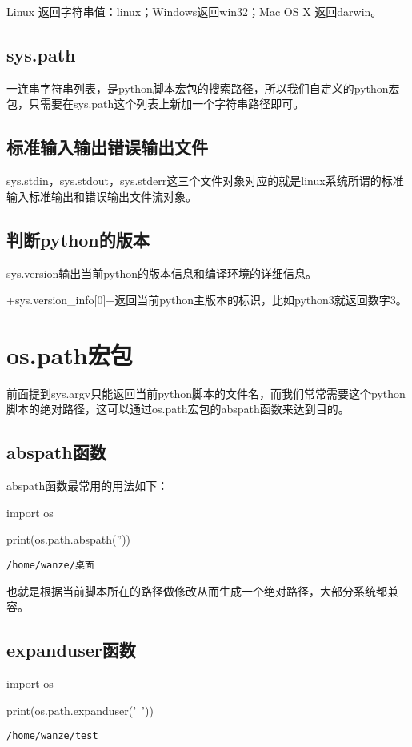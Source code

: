 \documentclass[12pt,oneside]{book}
\begin{document}
\begin{common-format}
Linux 返回字符串值：linux；Windows返回win32；Mac OS X 返回darwin。

\section{sys.path}
一连串字符串列表，是python脚本宏包的搜索路径，所以我们自定义的python宏包，只需要在sys.path这个列表上新加一个字符串路径即可。

\section{标准输入输出错误输出文件}
sys.stdin，sys.stdout，sys.stderr这三个文件对象对应的就是linux系统所谓的标准输入标准输出和错误输出文件流对象。

\section{判断python的版本}
sys.version输出当前python的版本信息和编译环境的详细信息。

+sys.version_info[0]+返回当前python主版本的标识，比如python3就返回数字3。



\chapter{os.path宏包}
前面提到sys.argv只能返回当前python脚本的文件名，而我们常常需要这个python脚本的绝对路径，这可以通过os.path宏包的abspath函数来达到目的。

\section{abspath函数}
abspath函数最常用的用法如下：
\begin{tcbpython}
import os

print(os.path.abspath(''))
\end{tcbpython}
\begin{Verbatim}
/home/wanze/桌面
\end{Verbatim}


也就是根据当前脚本所在的路径做修改从而生成一个绝对路径，大部分系统都兼容。

\section{expanduser函数}
\begin{tcbpython}
import os

print(os.path.expanduser('~'))
\end{tcbpython}
\begin{Verbatim}
/home/wanze/test
\end{Verbatim}


\end{common-format}
\end{document}
